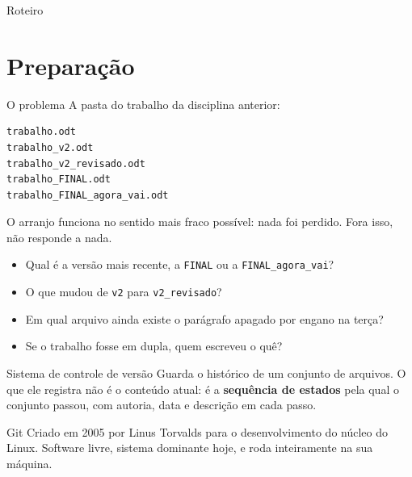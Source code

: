 \documentclass{beamer}
\begin{document}
\begin{frame}{Roteiro}
  \tableofcontents
\end{frame}

\section{Preparação}

\begin{frame}[fragile]{O problema}
  A pasta do trabalho da disciplina anterior:

  \begin{verbatim}
trabalho.odt
trabalho_v2.odt
trabalho_v2_revisado.odt
trabalho_FINAL.odt
trabalho_FINAL_agora_vai.odt
  \end{verbatim}

  \vspace{0.2cm}
  O arranjo funciona no sentido mais fraco possível: nada foi perdido. Fora
  isso, não responde a nada.

  \begin{itemize}
    \item Qual é a versão mais recente, a \texttt{FINAL} ou a
          \texttt{FINAL\_agora\_vai}?
    \item O que mudou de \texttt{v2} para \texttt{v2\_revisado}?
    \item Em qual arquivo ainda existe o parágrafo apagado por engano na terça?
    \item Se o trabalho fosse em dupla, quem escreveu o quê?
  \end{itemize}
\end{frame}

\begin{frame}{Sistema de controle de versão}
  Guarda o histórico de um conjunto de arquivos. O que ele registra não é o
  conteúdo atual: é a \textbf{sequência de estados} pela qual o conjunto passou,
  com autoria, data e descrição em cada passo.

  \vspace{0.5cm}
  \begin{block}{Git}
    Criado em 2005 por Linus Torvalds para o desenvolvimento do núcleo do Linux.
    Software livre, sistema dominante hoje, e roda inteiramente na sua máquina.
  \end{block}
\end{frame}
\end{document}

